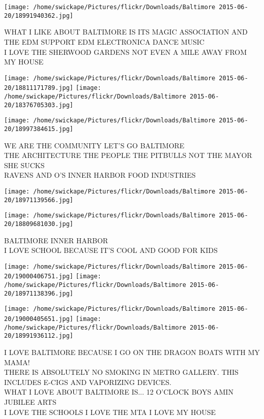 \documentclass[10pt,letterpaper]{article}
\begin{document}
\vspace{0.25in}
\texttt{[image: /home/swickape/Pictures/flickr/Downloads/Baltimore 2015-06-20/18991940362.jpg]}

WHAT I LIKE ABOUT BALTIMORE IS ITS MAGIC ASSOCIATION AND THE EDM SUPPORT EDM ELECTRONICA DANCE MUSIC\\
I LOVE THE SHERWOOD GARDENS NOT EVEN A MILE AWAY FROM MY HOUSE\\
\pagebreak

\texttt{[image: /home/swickape/Pictures/flickr/Downloads/Baltimore 2015-06-20/18811171789.jpg]}
\texttt{[image: /home/swickape/Pictures/flickr/Downloads/Baltimore 2015-06-20/18376705303.jpg]}

\texttt{[image: /home/swickape/Pictures/flickr/Downloads/Baltimore 2015-06-20/18997384615.jpg]}

WE ARE THE COMMUNITY LET'S GO BALTIMORE\\
THE ARCHITECTURE THE PEOPLE THE PITBULLS NOT THE MAYOR SHE SUCKS\\
RAVENS AND O'S INNER HARBOR FOOD INDUSTRIES\\
\pagebreak

\texttt{[image: /home/swickape/Pictures/flickr/Downloads/Baltimore 2015-06-20/18971139566.jpg]}

\vspace{0.25in}
\texttt{[image: /home/swickape/Pictures/flickr/Downloads/Baltimore 2015-06-20/18809681030.jpg]}

BALTIMORE INNER HARBOR\\
I LOVE SCHOOL BECAUSE IT'S COOL AND GOOD FOR KIDS\\
\pagebreak

\texttt{[image: /home/swickape/Pictures/flickr/Downloads/Baltimore 2015-06-20/19000406751.jpg]}
\texttt{[image: /home/swickape/Pictures/flickr/Downloads/Baltimore 2015-06-20/18971138396.jpg]}

\texttt{[image: /home/swickape/Pictures/flickr/Downloads/Baltimore 2015-06-20/19000405651.jpg]}
\texttt{[image: /home/swickape/Pictures/flickr/Downloads/Baltimore 2015-06-20/18991936112.jpg]}

I LOVE BALTIMORE BECAUSE I GO ON THE DRAGON BOATS WITH MY MAMA!\\
THERE IS ABSOLUTELY NO SMOKING IN METRO GALLERY.  THIS INCLUDES E{-}CIGS AND VAPORIZING DEVICES.\\
WHAT I LOVE ABOUT BALTIMORE IS... 12 O'CLOCK BOYS AMIN JUBILEE ARTS\\
I LOVE THE SCHOOLS I LOVE THE MTA I LOVE MY HOUSE\\
\pagebreak
\end{document}
